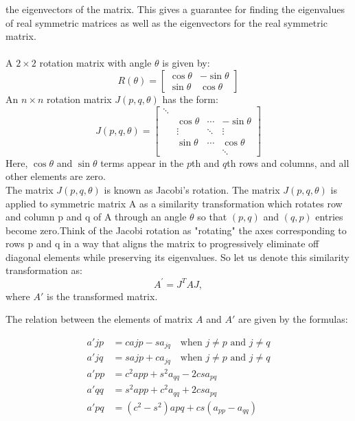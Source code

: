 \documentclass[journal]{IEEEtran}
\begin{document}
the eigenvectors of the matrix. This gives a guarantee for finding the eigenvalues of real symmetric matrices as well as the eigenvectors for the real symmetric matrix.\\\\
A $2 \times 2$ rotation matrix with angle $\theta$ is given by:
\[
R(\theta) =
\begin{bmatrix}
\cos\theta & -\sin\theta \\
\sin\theta & \cos\theta
\end{bmatrix}
\]
An $n \times n$ rotation matrix $J(p, q, \theta)$ has the form:
\[
J(p, q, \theta) = \begin{bmatrix}
\ddots & & & \\
& \cos\theta & \cdots & -\sin\theta \\
& \vdots & \ddots & \vdots \\
& \sin\theta & \cdots & \cos\theta \\
& & & \ddots
\end{bmatrix}
\]
Here, $\cos\theta$ and $\sin\theta$ terms appear in the $p$th and $q$th rows and columns, and all other elements are zero.\\

The matrix $J(p,q,\theta)$ is known as Jacobi’s rotation. The matrix $J(p,q,\theta)$ is applied to symmetric matrix A as a similarity transformation which rotates row and column p and q of A through an angle $\theta$ so that $(p, q)$ and $(q, p)$ entries become zero.Think of the Jacobi rotation as "rotating" the axes corresponding to rows p and  q in a way that aligns the matrix to progressively eliminate off diagonal elements while preserving its eigenvalues. So let us denote this similarity transformation as:\\
\[
A^{\prime} = J^{T} A J,
\]
where $A'$ is the transformed matrix.




The relation between the elements of matrix $A$ and $A'$ are given by the formulas:

\begin{align*}
    a'{jp} &= c a{jp} - s a_{jq} \quad \text{when } j \neq p \text{ and } j \neq q \\
    a'{jq} &= s a{jp} + c a_{jq} \quad \text{when } j \neq p \text{ and } j \neq q \\
    a'{pp} &= c^2 a{pp} + s^2 a_{qq} - 2cs a_{pq} \\
    a'{qq} &= s^2 a{pp} + c^2 a_{qq} + 2cs a_{pq} \\
    a'{pq} &= (c^2 - s^2) a{pq} + cs (a_{pp} - a_{qq})
\end{align*}
\end{document}
